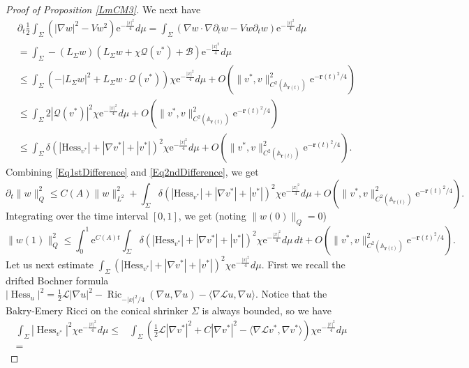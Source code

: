 \documentclass[12pt]{amsart}
\numberwithin{equation}{section}
\numberwithin{equation}{section}
\newcommand{\dt}{\delta}
\newcommand{\cL}{\mathcal{L}}
\DeclareMathOperator{\Ric}{Ric}
\DeclareMathOperator{\Hess}{Hess}
\begin{document}
\begin{proof}[Proof of Proposition \ref{LmCM3}]
		We next have 
		\begin{equation}\label{Eq2ndDifference}
			\begin{aligned}
				&\partial_t\frac12\int_\Sigma (|\nabla w|^2-V w^2) \mathrm{e}^{-\frac{|x|^2}{4}}d\mu=\int_\Sigma (\nabla w\cdot\nabla  \partial_tw-Vw \partial_t w) \mathrm{e}^{-\frac{|x|^2}{4}}d\mu\\
				&=\int_\Sigma - (L_\Sigma w)  (  L_\Sigma w+\chi \mathcal Q(v^*)+\mathcal B) \mathrm{e}^{-\frac{|x|^2}{4}}d\mu\\
				&\leq \int_\Sigma (-|L_\Sigma w|^2+ L_\Sigma w\cdot \mathcal Q(v^*))\chi \mathrm{e}^{-\frac{|x|^2}{4}}d\mu+O(\|v^*,v\|^2_{C^2(\mathbb A_{\mathbf r(t)})}\mathrm{e}^{-\mathbf r(t)^2/4})\\
				&\leq \int_\Sigma 2 | \mathcal Q(v^*)|^2\chi  \mathrm{e}^{-\frac{|x|^2}{4}}d\mu+O(\|v^*,v\|^2_{C^2(\mathbb A_{\mathbf r(t)})}\mathrm{e}^{-\mathbf r(t)^2/4})\\
				&\leq \int_\Sigma \dt(|\mathrm{Hess}_{v^*}|+|\nabla v^*|+|v^*|)^2\chi  \mathrm{e}^{-\frac{|x|^2}{4}}d\mu+O(\|v^*,v\|^2_{C^2(\mathbb A_{\mathbf r(t)})}\mathrm{e}^{-\mathbf r(t)^2/4}).
			\end{aligned}
		\end{equation}
		Combining \eqref{Eq1stDifference} and \eqref{Eq2ndDifference}, we get
		$$\partial_t \|w\|^2_{Q}\leq C(A)\|w\|^2_{L^2}+\int_\Sigma \dt(|\mathrm{Hess}_{v^*}|+|\nabla v^*|+|v^*|)^2\chi  \mathrm{e}^{-\frac{|x|^2}{4}}d\mu+O(\|v^*,v\|^2_{C^2(\mathbb A_{\mathbf r(t)})}\mathrm{e}^{-\mathbf r(t)^2/4}).$$
		Integrating over the time interval $[0,1]$, we get (noting $\|w(0)\|_Q=0$)
		$$\|w(1)\|^2_{Q}\leq \int_0^1 \mathrm{e}^{C(A)t}\int_\Sigma \dt(|\mathrm{Hess}_{v^*}|+|\nabla v^*|+|v^*|)^2\chi \mathrm{e}^{-\frac{|x|^2}{4}}d\mu\,dt+O(\|v^*,v\|^2_{C^2(\mathbb A_{\mathbf r(t)})}\mathrm{e}^{-\mathbf r(t)^2/4}).$$
		Let us next estimate $\int_\Sigma (|\mathrm{Hess}_{v^*}|+|\nabla v^*|+|v^*|)^2\chi \mathrm{e}^{-\frac{|x|^2}{4}}d\mu$. First we recall the drifted Bochner formula
		$|\Hess_u|^2=\frac{1}{2}\cL|\nabla u|^2-\Ric_{-|x|^2/4}(\nabla u,\nabla u)-\langle \nabla\cL u,\nabla u\rangle.$
		Notice that the Bakry-Emery Ricci on the conical shrinker $\Sigma$ is always bounded, so we have
		\[\begin{split}
			\int_\Sigma |\Hess_{v^*}|^2\chi  \mathrm{e}^{-\frac{|x|^2}{4}}d\mu
			\leq &
			\int_\Sigma\left(\frac{1}{2}\cL|\nabla v^*|^2+C|\nabla v^*|^2-\langle \nabla\cL v^*,\nabla v^*\rangle\right)\chi  \mathrm{e}^{-\frac{|x|^2}{4}}d\mu
			\\
			=&

\end{split}\]
\end{proof}
\end{document}

